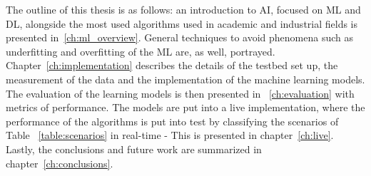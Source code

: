 The outline of this thesis is as follows:  an introduction to \ac{AI}, focused on \ac{ML} and \ac{DL}, alongside the most used algorithms used in academic and industrial fields is presented in~\ref{ch:ml_overview}. General techniques to avoid phenomena such as underfitting and overfitting of the \ac{ML} are, as well, portrayed. Chapter~\ref{ch:implementation} describes the details of the testbed set up, the measurement of the data and the implementation of the machine learning models. The evaluation of the learning models is then presented in ~\ref{ch:evaluation} with metrics of performance. The models are put into a live implementation, where the performance of the algorithms is put into test by classifying the scenarios of Table ~\ref{table:scenarios} in real-time - This is presented in chapter~\ref{ch:live}. Lastly, the conclusions and future work are summarized in chapter~\ref{ch:conclusions}.
